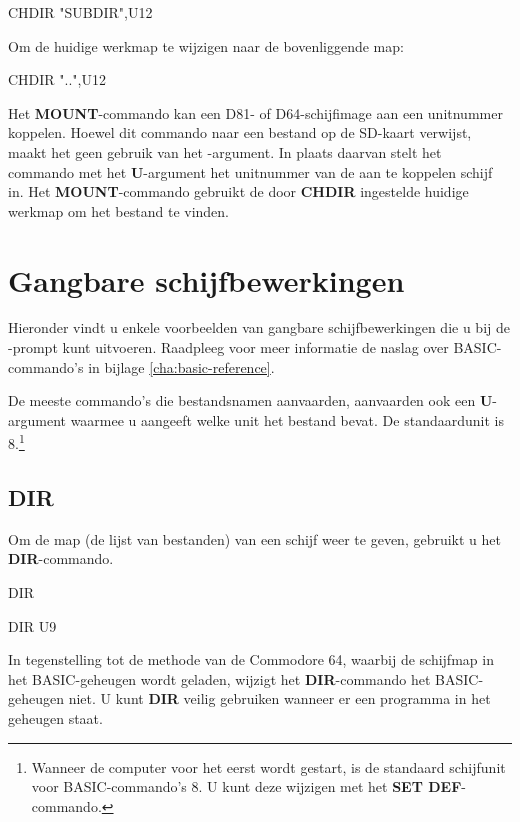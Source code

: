 \begin{screencode}
CHDIR "SUBDIR",U12
\end{screencode}

Om de huidige werkmap te wijzigen naar de bovenliggende map:

\begin{screencode}
CHDIR "..",U12
\end{screencode}

Het {\bf MOUNT}-commando kan een D81- of D64-schijfimage aan een unitnummer koppelen. Hoewel dit commando naar een bestand op de SD-kaart verwijst, maakt het geen gebruik van het -argument. In plaats daarvan stelt het commando met het {\bf U}-argument het unitnummer van de aan te koppelen schijf in. Het {\bf MOUNT}-commando gebruikt de door {\bf CHDIR} ingestelde huidige werkmap om het bestand te vinden.


\section{Gangbare schijfbewerkingen}

Hieronder vindt u enkele voorbeelden van gangbare schijfbewerkingen die u bij de -prompt kunt uitvoeren. Raadpleeg voor meer informatie de naslag over BASIC-commando's in bijlage \vref{cha:basic-reference}.

De meeste commando's die bestandsnamen aanvaarden, aanvaarden ook een {\bf U}-argument waarmee u aangeeft welke unit het bestand bevat. De standaardunit is 8.\footnote{Wanneer de computer voor het eerst wordt gestart, is de standaard schijfunit voor BASIC-commando's 8. U kunt deze wijzigen met het {\bf SET DEF}-commando.}

\subsection{DIR}

Om de map (de lijst van bestanden) van een schijf weer te geven, gebruikt u het {\bf DIR}-commando.

\begin{screencode}
DIR

DIR U9
\end{screencode}

In tegenstelling tot de methode van de Commodore 64, waarbij de schijfmap in het BASIC-geheugen wordt geladen, wijzigt het {\bf DIR}-commando het BASIC-geheugen niet. U kunt {\bf DIR} veilig gebruiken wanneer er een programma in het geheugen staat.

